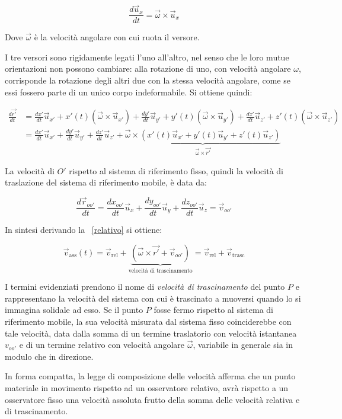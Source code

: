 \[
	\frac{d\vec{u}_x}{dt}=\vec{\omega} \times \vec{u}_x
\]

Dove $\vec{\omega}$ è la velocità angolare con cui ruota il versore.

I tre versori sono rigidamente legati l'uno all'altro, nel senso che le loro mutue orientazioni non possono cambiare: alla rotazione di uno, con velocità angolare $\omega$, corrisponde la rotazione degli altri due con la stessa velocità angolare, come se essi fossero parte di un unico corpo indeformabile. Si ottiene quindi:

\begin{equation*}
	\begin{aligned}
		\frac{d\vec{r'}}{dt} &= \frac{dx'}{dt} \vec{u}_{x'}+x'(t)(\vec{\omega} \times \vec{u}_{x'})+\frac{dy'}{dt} \vec{u}_{y'} +y'(t)(\vec{\omega} \times \vec{u}_{y'})+\frac{dz'}{dt} \vec{u}_{z'} +z'(t)(\vec{\omega} \times \vec{u}_{z'} ) \\
		&= \frac{dx'}{dt}\vec{u}_{x'}+ \frac{dy'}{dt}\vec{u}_{y'}+ \frac{dz'}{dt}\vec{u}_{z'} + \underbrace{\vec{\omega} \times (x'(t)\vec{u}_{x'}+y'(t)\vec{u}_{y'}+z'(t)\vec{u}_{z'})}_{\vec{\omega} \times \vec{r'}}
	\end{aligned}
\end{equation*}

La velocità di $O'$ rispetto al sistema di riferimento fisso, quindi la velocità di traslazione del sistema di riferimento mobile, è data da:

\[
	\frac{d\vec{r}_{oo'}}{dt}=\frac{dx_{oo'}}{dt}\vec{u}_x+\frac{dy_{oo'}}{dt}\vec{u}_y+\frac{dz_{oo'}}{dt}\vec{u}_z=\vec{v}_{oo'}
\]

In sintesi derivando la ~\eqref{relativo} si ottiene:

\[
	\vec{v}_{\text{ass}}(t)=\vec{v}_{\text{rel}}+\underbrace{(\vec{\omega} \times \vec{r'}+\vec{v}_{oo'})}_{\text{velocità di trascinamento}}=\vec{v}_{\text{rel}}+ \vec{v}_{ \text{trasc} }
\]

I termini evidenziati prendono il nome di \emph{velocità di trascinamento} del punto $P$ e rappresentano la velocità del sistema con cui è trascinato a muoversi quando lo si immagina solidale ad esso. Se il punto $P$ fosse fermo rispetto al sistema di riferimento mobile, la sua velocità misurata dal sistema fisso coinciderebbe con tale velocità, data dalla somma di un termine traslatorio con velocità istantanea $v_{oo'}$ e di un termine relativo con velocità angolare $\vec{\omega}$, variabile in generale sia in modulo che in direzione.

In forma compatta, la legge di composizione delle velocità afferma che un punto materiale in movimento rispetto ad un osservatore relativo, avrà rispetto a un osservatore fisso una velocità assoluta frutto della somma delle velocità relativa e di trascinamento.


